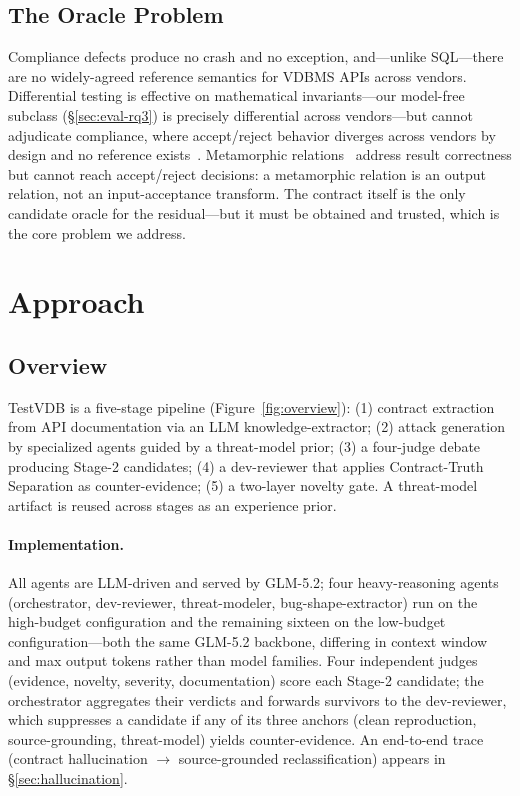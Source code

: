 \documentclass[sigconf]{acmart}
\begin{document}
\subsection{The Oracle Problem}
Compliance defects produce no crash and no exception, and---unlike SQL---there are no widely-agreed reference semantics for VDBMS APIs across vendors. Differential testing is effective on mathematical invariants---our model-free subclass (\S\ref{sec:eval-rq3}) is precisely differential across vendors---but cannot adjudicate compliance, where accept/reject behavior diverges across vendors by design and no reference exists~\cite{roadmap25}. Metamorphic relations~\cite{metmap24} address result correctness but cannot reach accept/reject decisions: a metamorphic relation is an output relation, not an input-acceptance transform. The contract itself is the only candidate oracle for the residual---but it must be obtained and trusted, which is the core problem we address.

\section{Approach}\label{sec:approach}

\subsection{Overview}
TestVDB is a five-stage pipeline (Figure~\ref{fig:overview}): (1) contract extraction from API documentation via an LLM knowledge-extractor; (2) attack generation by specialized agents guided by a threat-model prior; (3) a four-judge debate producing Stage-2 candidates; (4) a dev-reviewer that applies Contract-Truth Separation as counter-evidence; (5) a two-layer novelty gate. A threat-model artifact is reused across stages as an experience prior.

\paragraph{Implementation.} All agents are LLM-driven and served by GLM-5.2; four heavy-reasoning agents (orchestrator, dev-reviewer, threat-modeler, bug-shape-extractor) run on the high-budget configuration and the remaining sixteen on the low-budget configuration---both the same GLM-5.2 backbone, differing in context window and max output tokens rather than model families. Four independent judges (evidence, novelty, severity, documentation) score each Stage-2 candidate; the orchestrator aggregates their verdicts and forwards survivors to the dev-reviewer, which suppresses a candidate if any of its three anchors (clean reproduction, source-grounding, threat-model) yields counter-evidence. An end-to-end trace (contract hallucination $\to$ source-grounded reclassification) appears in \S\ref{sec:hallucination}.
\end{document}
